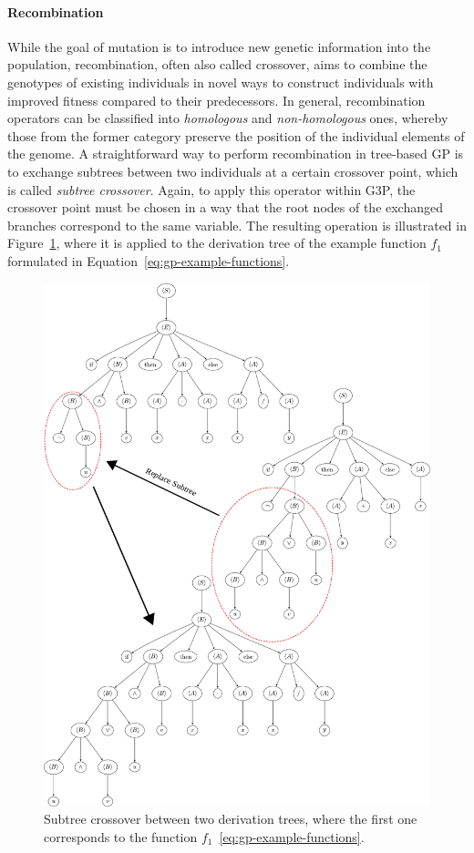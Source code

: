 \paragraph{Recombination}
While the goal of mutation is to introduce new genetic information into the population, recombination, often also called crossover, aims to combine the genotypes of existing individuals in novel ways to construct individuals with improved fitness compared to their predecessors.
In general, recombination operators can be classified into \emph{homologous} and \emph{non-homologous} ones, whereby those from the former category preserve the position of the individual elements of the genome.
A straightforward way to perform recombination in tree-based GP is to exchange subtrees between two individuals at a certain crossover point, which is called \emph{subtree crossover}.
Again, to apply this operator within G3P, the crossover point must be chosen in a way that the root nodes of the exchanged branches correspond to the same variable.
The resulting operation is illustrated in Figure~\ref{fig:gp-subtree-crossover}, where it is applied to the derivation tree of the example function $f_1$ formulated in Equation~\eqref{eq:gp-example-functions}.  
\begin{figure}
    \centering
	\includegraphics[scale=0.475]{figures/trees/subtree_crossover.pdf}
	\caption{Subtree crossover between two derivation trees, where the first one corresponds to the function $f_1$~\eqref{eq:gp-example-functions}.}
	\label{fig:gp-subtree-crossover}
\end{figure}
